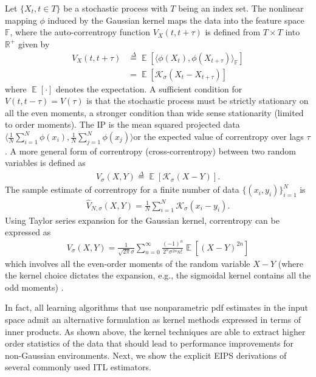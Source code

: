 \documentclass[8pt,twocolumn]{IEEEtran}
\DeclareMathOperator{\Ex}{\mathbb{E}}
\begin{document}
Let $\{X_t,t\in T\}$ be a stochastic process with $T$ being an index set. The nonlinear mapping $\phi$ induced by the Gaussian kernel maps the data into the feature space $\mathbb{F}$, where the auto-correntropy function $V_X(t,t+\tau)$ is defined from $T\times T$ into $\mathbb{R}^+$ given by
\begin{align}
V_X(t,t+\tau)&\stackrel{\Delta}{=}\Ex[\langle\phi(X_t),\phi(X_{t+\tau})\rangle_\mathbb{F}]\\
&=\Ex[\mathcal{K}_{\sigma}(X_t-X_{t+\tau})]
\end{align}
where $\Ex[\cdot]$ denotes the expectation. A sufficient condition for $V(t,t-\tau) = V(\tau)$ is that the stochastic process must be strictly stationary on all the even moments, a stronger condition than wide sense stationarity (limited to  order moments). The IP is the mean squared projected data $\langle \frac{1}{N}\sum^N_{i=1}\phi(x_i),\frac{1}{N}\sum^N_{j=1}\phi(x_j) \rangle$or the expected value of correntropy over lags $\tau$. A more general form of correntropy (cross-correntropy) \cite{LiuCorrentropy2007} between two random variables is defined as
\begin{align}
V_\sigma(X,Y) \stackrel{\Delta}{=} \Ex[\mathcal{K}_{\sigma}(X-Y)].
\end{align}
The sample estimate of correntropy for a finite number of data $\{(x_i,y_i)\}^N_{i=1}$ is
\begin{align}
\hat{V}_{N,\sigma}(X,Y)=\frac{1}{N}\sum^N_{i=1}\mathcal{K}_{\sigma}(x_i-y_i).
\end{align}
Using Taylor series expansion for the Gaussian kernel, correntropy can be expressed as
\begin{align}
V_{\sigma}(X,Y)=\frac{1}{\sqrt{2\pi}\sigma}\sum^\infty_{n=0}\frac{(-1)^n}{2^n\sigma^{2n}n!}\Ex[(X-Y)^{2n}]
\end{align}
which involves all the even-order moments of the random variable $X-Y$ (where the kernel choice dictates the expansion, e.g., the sigmoidal kernel contains all the odd moments) \cite{Santamaria2006}. 

In fact, all learning algorithms that use nonparametric pdf estimates in the input space admit an alternative formulation as kernel methods expressed in terms of inner products. As shown above, the kernel techniques are able to extract higher order statistics of the data that should lead to performance improvements for non-Gaussian environments. Next, we show the explicit EIPS derivations of several commonly used ITL estimators.
\end{document}
